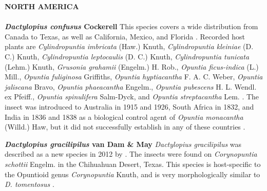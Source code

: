 \noindent \textbf{NORTH AMERICA} \\ \\
\noindent \textbf{\textit{Dactylopius confusus} Cockerell} \newline
This species covers a wide distribution from Canada to Texas, as well as California, Mexico, and Florida \citep{Gilreath1987BionomicsDactylopiidae}. Recorded host plants are \textit{Cylindropuntia imbricata} (Haw.) Knuth, \textit{Cylindropuntia kleiniae} (D. C.) Knuth, \textit{Cylindropuntia leptocaulis} (D. C.) Knuth, \textit{Cylindropuntia tunicata} (Lehm.) Knuth, \textit{Grusonia grahamii} (Engelm.) H. Rob., \textit{Opuntia ficus-indica} (L.) Mill., \textit{Opuntia fuliginosa} Griffiths, \textit{Opuntia hyptiacantha} F. A. C. Weber, \textit{Opuntia jaliscana} Bravo, \textit{Opuntia phaeacantha} Engelm., \textit{Opuntia pubescens} H. L. Wendl. ex Pfeiff., \textit{Opuntia spinulifera} Salm-Dyck, and \textit{Opuntia streptacantha} Lem. \citep{Mann1969Cactus-feedingMites, Chavez-Moreno2011DistributionOpuntioideae}. The insect was introduced to Australia in 1915 and 1926, South Africa in 1832, and India in 1836 and 1838 as a biological control agent of \textit{Opuntia monacantha} (Willd.) Haw, but it did not successfully establish in any of these countries \citep{Dodd1940, Winston2014BiologicalWeeds.}. \newline 

\noindent \textbf{\textit{Dactylopius gracilipilus} van Dam \& May}  \newline
\textit{Dactylopius gracilipilus} was described as a new species in 2012 by \citet{VanDam2012}. The insects were found on \textit{Corynopuntia schottii} Engelm. in the Chihuahuan Desert, Texas. This species is host-specific to the Opuntioid genus \textit{Corynopuntia} Knuth, and is very morphologically similar to \textit{D. tomentosus} \citep{VanDam2012}. \\

